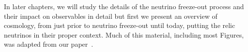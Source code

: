  In later chapters, we will study the details of the neutrino freeze-out process and their impact on observables in detail but first we present an overview of cosmology, from just prior to neutrino freeze-out until today, putting the relic neutrinos in their proper context. Much of this material, including most Figures, was adapted from our paper~\cite{ErasOfUniverse}.




